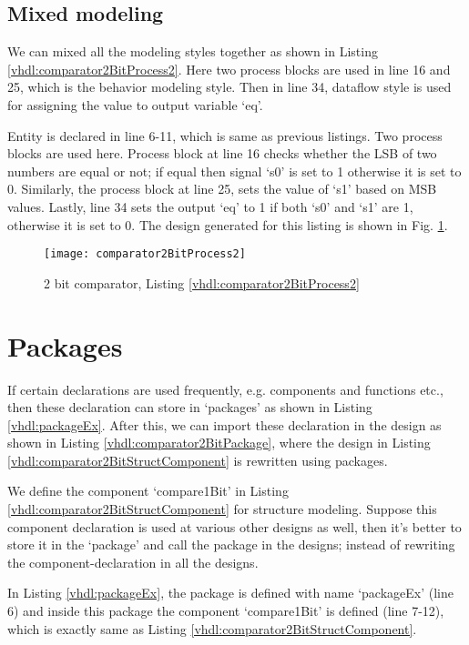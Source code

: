 \subsection{Mixed modeling}
We can mixed all the modeling styles together as shown in Listing \ref{vhdl:comparator2BitProcess2}. Here two process blocks are used in line 16 and 25, which is the behavior modeling style. Then in line 34, dataflow style is used for assigning the value to output variable `eq'.

\begin{explanation}
	Entity is declared in line 6-11, which is same as previous listings. Two process blocks are used here. Process block at line 16 checks whether the LSB of two numbers are equal or not; if equal then signal `s0' is set to 1 otherwise it is set to 0. Similarly, the process block at line 25, sets the value of `s1' based on MSB values. Lastly, line 34 sets the output `eq' to 1 if both `s0' and `s1' are 1, otherwise it is set to 0. The design generated for this listing is shown in Fig. \ref{fig:comparator2BitProcess2}.
\end{explanation}

\begin{figure}
	\centering
	\texttt{[image: comparator2BitProcess2]}
	\caption{2 bit comparator, Listing \ref{vhdl:comparator2BitProcess2}}
	\label{fig:comparator2BitProcess2}
\end{figure}

\section{Packages}
If certain declarations are used frequently, e.g. components and functions etc., then these declaration can store in `packages' as shown in Listing \ref{vhdl:packageEx}. After this, we can import these declaration in the design as shown in Listing \ref{vhdl:comparator2BitPackage}, where the design in Listing \ref{vhdl:comparator2BitStructComponent} is rewritten using packages.

\begin{explanation}
We define the component `compare1Bit' in Listing \ref{vhdl:comparator2BitStructComponent} for structure modeling. Suppose this component declaration is used at various other designs as well, then it's better to store it in the `package' and call the package in the designs; instead of rewriting the component-declaration in all the designs.

In Listing \ref{vhdl:packageEx}, the package is defined with name `packageEx' (line 6) and inside this package the component `compare1Bit' is defined (line 7-12), which is exactly same as Listing \ref{vhdl:comparator2BitStructComponent}. 
\end{explanation}

